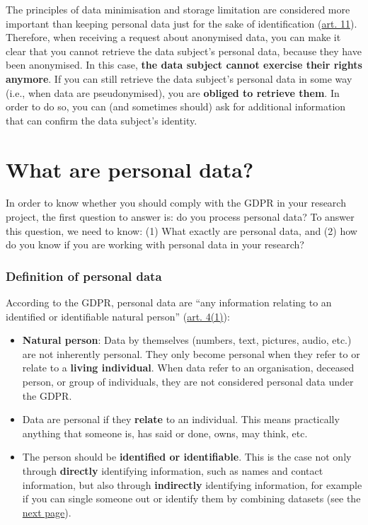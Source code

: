 \documentclass[
]{book}
\providecommand{\tightlist}{%
  \setlength{\itemsep}{0pt}\setlength{\parskip}{0pt}}
\begin{document}
The principles of data minimisation and storage limitation are considered more
important than keeping personal data just for the sake of identification
(\href{https://gdpr-info.eu/art-11-gdpr/}{art. 11}).
Therefore, when receiving a request about anonymised data, you can make it clear
that you cannot retrieve the data subject's personal data, because they have
been anonymised. In this case, \textbf{the data subject cannot exercise their rights
anymore}. If you can still retrieve the data subject's personal data in some
way (i.e., when data are pseudonymised), you are \textbf{obliged to retrieve them}.
In order to do so, you can (and sometimes should) ask for additional information
that can confirm the data subject's identity.

\hypertarget{personal-data}{%
\chapter{What are personal data?}\label{personal-data}}

In order to know whether you should comply with the GDPR in your research
project, the first question to answer is: do you process personal data? To
answer this question, we need to know: (1) What exactly are personal data,
and (2) how do you know if you are working with personal data in your research?

\hypertarget{definition-personal-data}{%
\subsection{Definition of personal data}\label{definition-personal-data}}

According to the GDPR, personal data are ``any information relating to an
identified or identifiable natural person''
(\href{https://gdpr-info.eu/art-4-gdpr/}{art. 4(1)}):

\begin{itemize}
\tightlist
\item
  \textbf{Natural person}: Data by themselves (numbers, text, pictures, audio, etc.)
  are not inherently personal. They only become personal when they refer to or
  relate to a \textbf{living individual}. When data refer to an organisation,
  deceased person, or group of individuals, they are not considered personal data
  under the GDPR.
\item
  Data are personal if they \textbf{relate} to an individual. This means practically
  anything that someone is, has said or done, owns, may think, etc.
\item
  The person should be \textbf{identified or identifiable}. This is the case not
  only through \textbf{directly} identifying information, such as names and contact
  information, but also through \textbf{indirectly} identifying information, for
  example if you can single someone out or identify them by combining datasets
  (see the \protect\hyperlink{personal-data-assess}{next page}).
\end{itemize}
\end{document}
